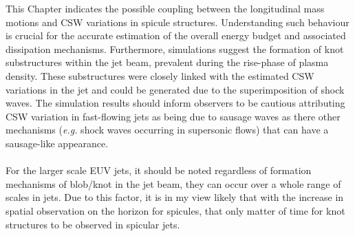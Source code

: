 \documentclass[12pt]{ociamthesis}
\newcommand{\np}{\\ \\}
\begin{document}
%
This Chapter indicates the possible coupling between the longitudinal mass motions and CSW variations in spicule structures. Understanding such behaviour is crucial for the accurate estimation of the overall energy budget and associated dissipation mechanisms. Furthermore, simulations suggest the formation of knot substructures within the jet beam, prevalent during the rise-phase of plasma density. These substructures were closely linked with the estimated CSW variations in the jet and could be generated due to the superimposition of shock waves. The simulation results should inform observers to be cautious attributing CSW variation in fast-flowing jets as being due to sausage waves as there other mechanisms (\textit{e.g.} shock waves occurring in supersonic flows) that can have a sausage-like appearance. \np
%
For the larger scale EUV jets, it should be noted regardless of formation mechanisms of blob/knot in the jet beam, they can occur over a whole range of scales in jets. Due to this factor, it is in my view likely that with the increase in spatial observation on the horizon for spicules, that only matter of time for knot structures to be observed in spicular jets.


  
\end{document}
